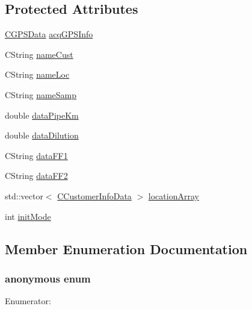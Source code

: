 \subsection*{Protected Attributes}
\begin{DoxyCompactItemize}
\item 
\hyperlink{classCGPSData}{CGPSData} \hyperlink{classCCustomerInfoDialog_aa7f93c39debfd4e1b7afdb72b3517ce1}{acqGPSInfo}
\item 
CString \hyperlink{classCCustomerInfoDialog_a326798c7c4e0ba24e2468fde8da2a6b8}{nameCust}
\item 
CString \hyperlink{classCCustomerInfoDialog_a50878f665714c3d50f518a7c7a0ad5a8}{nameLoc}
\item 
CString \hyperlink{classCCustomerInfoDialog_a5ba07e15af46921ad7d9ed647d59f707}{nameSamp}
\item 
double \hyperlink{classCCustomerInfoDialog_af04bc177e8ca4af8f22ba60d3c8f6084}{dataPipeKm}
\item 
double \hyperlink{classCCustomerInfoDialog_ac254074b1f4b13db343ed553b175caf2}{dataDilution}
\item 
CString \hyperlink{classCCustomerInfoDialog_a1d405953886479e11e06dd455ca761e6}{dataFF1}
\item 
CString \hyperlink{classCCustomerInfoDialog_a971118b2c41b81108ece6b0f482ca5a5}{dataFF2}
\item 
std::vector$<$ \hyperlink{classCCustomerInfoData}{CCustomerInfoData} $>$ \hyperlink{classCCustomerInfoDialog_a52af4f801fc841e234c685f7211b5fa3}{locationArray}
\item 
int \hyperlink{classCCustomerInfoDialog_ae1a2c6ab303463c4e3bcaf5783370469}{initMode}
\end{DoxyCompactItemize}


\subsection{Member Enumeration Documentation}
\hypertarget{classCCustomerInfoDialog_a593f1b38cc6dbbbe341ce9824a630738}{
\subsubsection[{"@2}]{\setlength{\rightskip}{0pt plus 5cm}anonymous enum}}
\label{classCCustomerInfoDialog_a593f1b38cc6dbbbe341ce9824a630738}
\begin{Desc}
\item[Enumerator: ]\par
\begin{description}
\item[{\em 
\hypertarget{classCCustomerInfoDialog_a593f1b38cc6dbbbe341ce9824a630738a3c292e3b87430c752073c078956ef526}{
IDD}
\label{classCCustomerInfoDialog_a593f1b38cc6dbbbe341ce9824a630738a3c292e3b87430c752073c078956ef526}
}]\end{description}
\end{Desc}

